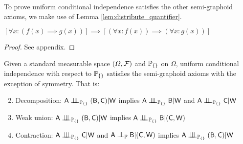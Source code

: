 To prove uniform conditional independence satisfies the other semi-graphoid axioms, we make use of Lemma \ref{lem:distribute_quantifier}.

\begin{lemma}\label{lem:distribute_quantifier}
$[\forall x: (f(x)\implies g(x))]\implies[(\forall x: f(x))\implies(\forall x: g(x))]$
\end{lemma}

\begin{proof}
See appendix.
\end{proof}

\begin{theorem}
Given a standard measurable space $(\Omega,\mathcal{F})$ and $\mathbb{P}_{\{\}}$ on $\Omega$, uniform conditional independence with respect to $\mathbb{P}_{\{\}}$ satisfies the semi-graphoid axioms with the exception of symmetry. That is:

\begin{enumerate}
  	\setcounter{enumi}{1}
	\item Decomposition: $\RV{A}\CII_{\prob{P}_{\{\}}} (\RV{B},\RV{C})|\RV{W}$ implies $\RV{A}\CII_{\prob{P}_{\{\}}}\RV{B}|\RV{W}$ and $\RV{A}\CII_{\prob{P}_{\{\}}}\RV{C}|\RV{W}$
	\item Weak union: $\RV{A}\CII_{\prob{P}_{\{\}}}(\RV{B},\RV{C})|\RV{W}$ implies $\RV{A}\CII_{\prob{P}_{\{\}}}\RV{B}|(\RV{C},\RV{W})$
	\item Contraction: $\RV{A}\CII_{\prob{P}_{\{\}}}\RV{C}|\RV{W}$ and $\RV{A}\CI_{\prob{P}}\RV{B}|(\RV{C},\RV{W})$ implies $\RV{A}\CII_{\prob{P}_{\{\}}}(\RV{B},\RV{C})|\RV{W}$
\end{enumerate}
\end{theorem}


